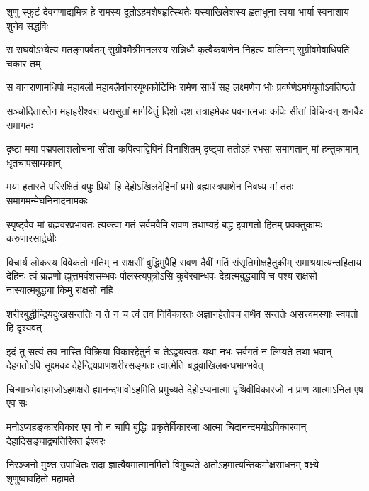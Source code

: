 \fourlineindentedshloka
{शृणु स्फुटं देवगणाद्यमित्र हे}
{रामस्य दूतोऽहमशेषहृत्स्थितेः}
{यस्याखिलेशस्य हृताधुना त्वया}
{भार्या स्वनाशाय शुनेव सद्धविः} %

\fourlineindentedshloka
{स राघवोऽभ्येत्य मतङ्गपर्वतम्}
{सुग्रीवमैत्रीमनलस्य सन्निधौ}
{कृत्वैकबाणेन निहत्य वालिनम्}
{सुग्रीवमेवाधिपतिं चकार तम्} %

\fourlineindentedshloka
{स वानराणामधिपो महाबली}
{महाबलैर्वानरयूथकोटिभिः}
{रामेण सार्धं सह लक्ष्मणेन भोः}
{प्रवर्षणेऽमर्षयुतोऽवतिष्ठते} %

\fourlineindentedshloka
{सञ्चोदितास्तेन महाहरीश्वरा}
{धरासुतां मार्गयितुं दिशो दश}
{तत्राहमेकः पवनात्मजः कपिः}
{सीतां विचिन्वन् शनकैः समागतः} %

\fourlineindentedshloka
{दृष्टा मया पद्मपलाशलोचना}
{सीता कपित्वाद्विपिनं विनाशितम्}
{दृष्ट्वा ततोऽहं रभसा समागतान्}
{मां हन्तुकामान् धृतचापसायकान्} %

\fourlineindentedshloka
{मया हतास्ते परिरक्षितं वपुः}
{प्रियो हि देहोऽखिलदेहिनां प्रभो}
{ब्रह्मास्त्रपाशेन निबध्य मां ततः}
{समागमन्मेघनिनादनामकः} %

\fourlineindentedshloka
{स्पृष्ट्वैव मां ब्रह्मवरप्रभावतः}
{त्यक्त्वा गतं सर्वमवैमि रावण}
{तथाप्यहं बद्ध इवागतो हितम्}
{प्रवक्तुकामः करुणारसार्द्रधीः} %

\fourlineindentedshloka
{विचार्य लोकस्य विवेकतो गतिम्}
{न राक्षसीं बुद्धिमुपैहि रावण}
{दैवीं गतिं संसृतिमोक्षहैतुकीम्}
{समाश्रयात्यन्तहिताय देहिनः} %
{त्वं ब्रह्मणो ह्युत्तमवंशसम्भवः}
{पौलस्त्यपुत्रोऽसि कुबेरबान्धवः}
{देहात्मबुद्ध्यापि च पश्य राक्षसो}
{नास्यात्मबुद्ध्या किमु राक्षसो नहि} %

\fourlineindentedshloka
{शरीरबुद्धीन्द्रियदुःखसन्ततिः}
{न ते न च त्वं तव निर्विकारतः}
{अज्ञानहेतोश्च तथैव सन्ततेः}
{असत्त्वमस्याः स्वपतो हि दृश्यवत्} %

\fourlineindentedshloka
{इदं तु सत्यं तव नास्ति विक्रिया}
{विकारहेतुर्न च तेऽद्वयत्वतः}
{यथा नभः सर्वगतं न लिप्यते}
{तथा भवान् देहगतोऽपि सूक्ष्मकः}
{देहेन्द्रियप्राणशरीरसङ्गतः}
{त्वात्मेति बद्ध्वाखिलबन्धभाग्भवेत्} %

\fourlineindentedshloka
{चिन्मात्रमेवाहमजोऽहमक्षरो}
{ह्यानन्दभावोऽहमिति प्रमुच्यते}
{देहोऽप्यनात्मा पृथिवीविकारजो}
{न प्राण आत्माऽनिल एष एव सः} %

\fourlineindentedshloka
{मनोऽप्यहङ्कारविकार एव नो}
{न चापि बुद्धिः प्रकृतेर्विकारजा}
{आत्मा चिदानन्दमयोऽविकारवान्}
{देहादिसङ्घाद्व्यतिरिक्त ईश्वरः} %

\fourlineindentedshloka
{निरञ्जनो मुक्त उपाधितः सदा}
{ज्ञात्वैवमात्मानमितो विमुच्यते}
{अतोऽहमात्यन्तिकमोक्षसाधनम्}
{वक्ष्ये शृणुष्वावहितो महामते} %

